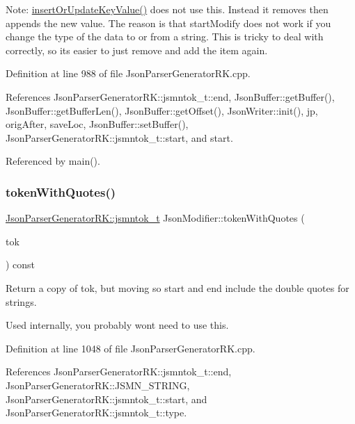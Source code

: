 Note\+: \hyperlink{class_json_modifier_acca6028c0ec31489950f43e86c574229}{insert\+Or\+Update\+Key\+Value()} does not use this. Instead it removes then appends the new value. The reason is that start\+Modify does not work if you change the type of the data to or from a string. This is tricky to deal with correctly, so it\textquotesingle{}s easier to just remove and add the item again. 

Definition at line 988 of file Json\+Parser\+Generator\+R\+K.\+cpp.



References Json\+Parser\+Generator\+R\+K\+::jsmntok\+\_\+t\+::end, Json\+Buffer\+::get\+Buffer(), Json\+Buffer\+::get\+Buffer\+Len(), Json\+Buffer\+::get\+Offset(), Json\+Writer\+::init(), jp, orig\+After, save\+Loc, Json\+Buffer\+::set\+Buffer(), Json\+Parser\+Generator\+R\+K\+::jsmntok\+\_\+t\+::start, and start.



Referenced by main().

\mbox{\label{class_json_modifier_a5e685480ff2e978480cdc215b340e3a7}} 
\subsubsection{\texorpdfstring{token\+With\+Quotes()}{tokenWithQuotes()}}
{\footnotesize\ttfamily \hyperlink{struct_json_parser_generator_r_k_1_1jsmntok__t}{Json\+Parser\+Generator\+R\+K\+::jsmntok\+\_\+t} Json\+Modifier\+::token\+With\+Quotes (\begin{DoxyParamCaption}\item[{const \hyperlink{struct_json_parser_generator_r_k_1_1jsmntok__t}{Json\+Parser\+Generator\+R\+K\+::jsmntok\+\_\+t} $\ast$}]{tok }\end{DoxyParamCaption}) const}



Return a copy of tok, but moving so start and end include the double quotes for strings. 

Used internally, you probably won\textquotesingle{}t need to use this. 

Definition at line 1048 of file Json\+Parser\+Generator\+R\+K.\+cpp.



References Json\+Parser\+Generator\+R\+K\+::jsmntok\+\_\+t\+::end, Json\+Parser\+Generator\+R\+K\+::\+J\+S\+M\+N\+\_\+\+S\+T\+R\+I\+NG, Json\+Parser\+Generator\+R\+K\+::jsmntok\+\_\+t\+::start, and Json\+Parser\+Generator\+R\+K\+::jsmntok\+\_\+t\+::type.



